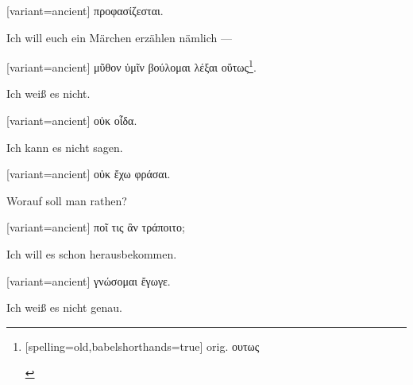 \switchcolumn

\begin{greek}[variant=ancient]%
προφασίζεσται.

\end{greek}%
\switchcolumn*

Ich will euch ein Märchen erzählen nämlich — 

\switchcolumn

\begin{greek}[variant=ancient]%
μῦθον ὑμῖν βούλομαι λέξαι οὕτως\footnote{\begin{german}[spelling=old,babelshorthands=true]%
orig. \textgreek[variant=ancient]{ουτως}\end{german}%
}.

\end{greek}%
Ich weiß es nicht. 

\switchcolumn

\begin{greek}[variant=ancient]%
οὐκ οἶδα.

\end{greek}%
\switchcolumn*

Ich kann es nicht sagen. 

\switchcolumn

\begin{greek}[variant=ancient]%
οὐκ ἔχω φράσαι.

\end{greek}%
\switchcolumn*

Worauf soll man rathen? 

\switchcolumn

\begin{greek}[variant=ancient]%
ποῖ τις ἂν τράποιτο;

\end{greek}%
\switchcolumn*

Ich will es schon heraus\textcompwordmark{}bekommen.

\switchcolumn

\begin{greek}[variant=ancient]%
γνώσομαι ἔγωγε.

\end{greek}%
\switchcolumn*

Ich weiß es nicht genau. 

